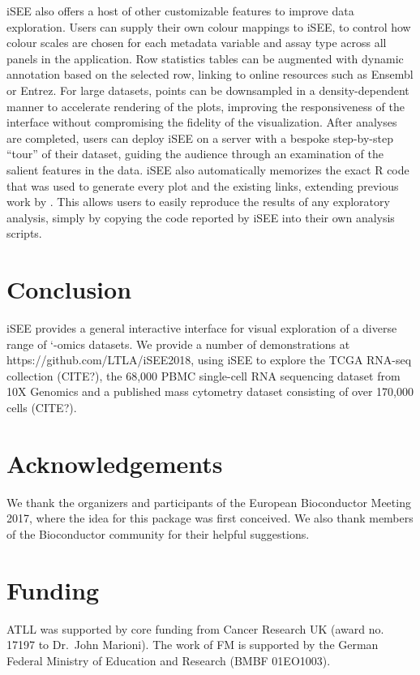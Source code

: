 \documentclass{bioinfo}
\begin{document}
iSEE also offers a host of other customizable features to improve data exploration. 
Users can supply their own colour mappings to iSEE, to control how colour scales are chosen for each metadata variable and assay type across all panels in the application.
Row statistics tables can be augmented with dynamic annotation based on the selected row, linking to online resources such as Ensembl or Entrez. %
For large datasets, points can be downsampled in a density-dependent manner to accelerate rendering of the plots, improving the responsiveness of the interface without compromising the fidelity of the visualization. 
After analyses are completed, users can deploy iSEE on a server with a bespoke step-by-step ``tour'' of their dataset, guiding the audience through an examination of the salient features in the data.
iSEE also automatically memorizes the exact R code that was used to generate every plot and the existing links, 
extending previous work by \cite{marini2016interrepro}.
This allows users to easily reproduce the results of any exploratory analysis, simply by copying the code reported by iSEE into their own analysis scripts. 

\section{Conclusion}
iSEE provides a general interactive interface for visual exploration of a diverse range of `-omics datasets. 
We provide a number of demonstrations at https://github.com/LTLA/iSEE2018, using iSEE to explore the TCGA RNA-seq collection (CITE?), the 68,000 PBMC single-cell RNA sequencing dataset from 10X Genomics \citep{zheng2017massively} and a published mass cytometry dataset consisting of over 170,000 cells (CITE?). 

\section*{Acknowledgements}
We thank the organizers and participants of the European Bioconductor Meeting 2017, where the idea for this package was first conceived.
We also thank members of the Bioconductor community for their helpful suggestions. 
\vspace*{-12pt}

\section*{Funding}
ATLL was supported by core funding from Cancer Research UK (award no. 17197 to Dr.\ John Marioni).
The work of FM is supported by the German Federal Ministry of Education and Research (BMBF 01EO1003).
\vspace*{-12pt}

%
%

%
%
%
%
%

\end{document}
